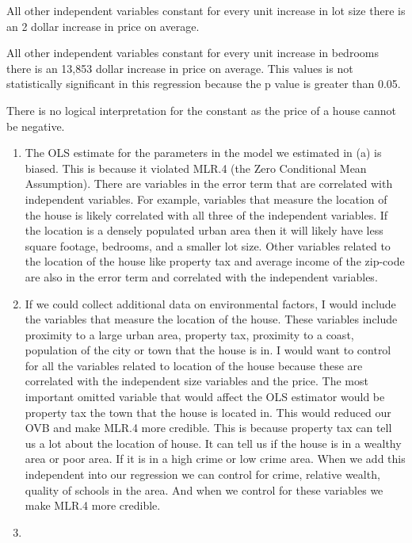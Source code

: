 \documentclass[
  12pt,
  landscape]{article}
\begin{document}
All other independent variables constant for every unit increase in lot
size there is an 2 dollar increase in price on average.

All other independent variables constant for every unit increase in
bedrooms there is an 13,853 dollar increase in price on average. This
values is not statistically significant in this regression because the p
value is greater than 0.05.

There is no logical interpretation for the constant as the price of a
house cannot be negative.

\begin{enumerate}
\def\labelenumi{(\alph{enumi})}
\setcounter{enumi}{1}
\item
  The OLS estimate for the parameters in the model we estimated in (a)
  is biased. This is because it violated MLR.4 (the Zero Conditional
  Mean Assumption). There are variables in the error term that are
  correlated with independent variables. For example, variables that
  measure the location of the house is likely correlated with all three
  of the independent variables. If the location is a densely populated
  urban area then it will likely have less square footage, bedrooms, and
  a smaller lot size. Other variables related to the location of the
  house like property tax and average income of the zip-code are also in
  the error term and correlated with the independent variables.
\item
  If we could collect additional data on environmental factors, I would
  include the variables that measure the location of the house. These
  variables include proximity to a large urban area, property tax,
  proximity to a coast, population of the city or town that the house is
  in. I would want to control for all the variables related to location
  of the house because these are correlated with the independent size
  variables and the price. The most important omitted variable that
  would affect the OLS estimator would be property tax the town that the
  house is located in. This would reduced our OVB and make MLR.4 more
  credible. This is because property tax can tell us a lot about the
  location of house. It can tell us if the house is in a wealthy area or
  poor area. If it is in a high crime or low crime area. When we add
  this independent into our regression we can control for crime,
  relative wealth, quality of schools in the area. And when we control
  for these variables we make MLR.4 more credible.
\item
\end{enumerate}
\end{document}

